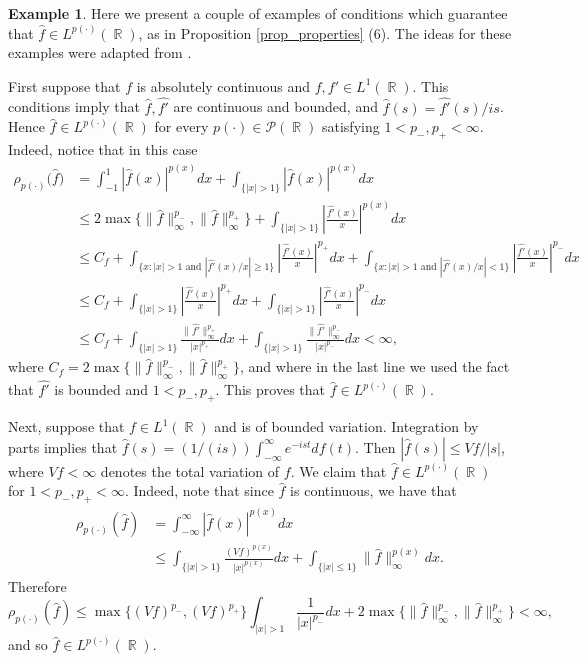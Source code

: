 \documentclass[11pt,reqno]{amsart}
\theoremstyle{definition}
\newtheorem{example}[theorem]{Example}
\theoremstyle{definition}
\theoremstyle{definition}
\DeclareMathOperator{\R}{\mathbb{R}}
\newcommand{\p}{p(\cdot)}
\newcommand{\Lp}{L^{\p}(\R)}
\begin{document}
\begin{example} 
Here we present a couple of examples of  conditions which guarantee that $\widehat{f}\in\Lp$, as in Proposition \ref{prop_properties} {(6)}. The ideas for these examples were adapted from \cite{Talvila2025}.

    First suppose that $f$ is absolutely continuous and $f,f'\in L^1(\R)$. This conditions imply that $\widehat{f},\widehat{f'}$ are continuous and bounded, and $\widehat{f}(s)=\widehat{f'}(s)/is$. Hence $\widehat{f}\in L^{\p}(\R)$ for every $\p\in\mathcal{P}(\R)$ satisfying $1<p_{-},p_{+}<\infty$. Indeed, notice that in this case
    \begin{align*}
        \rho_{\p}\Big(\hat{f}\Big)&=\int_{-1}^1 |\widehat{f}(x)|^{p(x)}dx+\int_{\{|x|>1\}}|\widehat{f}(x)|^{p(x)}dx\\
        &\leq 2\max\{\|\widehat{f}\|_{\infty}^{p_{-}},\|\widehat{f}\|_{\infty}^{p_{+}}\}
        +\int_{\{|x|>1\}}\left|\frac{\widehat{f'}(x)}{x}\right|^{p(x)}dx\\
        &\leq C_f+\int_{\{x:|x|>1 \text{ and }|\widehat{f'}(x)/x|\geq 1\}} \left|\frac{\widehat{f'}(x)}{x}\right|^{p_{+}}dx+\int_{\{x:|x|>1 \text{ and }|\widehat{f'}(x)/x|< 1\}} \left|\frac{\widehat{f'}(x)}{x}\right|^{p_{-}}dx\\
        &\leq C_f+\int_{\{|x|>1\}} \left|\frac{\widehat{f'}(x)}{x}\right|^{p_{+}}dx+\int_{\{|x|>1\}} \left|\frac{\widehat{f'}(x)}{x}\right|^{p_{-}}dx\\
        &\leq C_f+\int_{\{|x|>1\}} \frac{\|\widehat{f'}\|^{p_+}_\infty}{|x|^{p_{+}}}dx+\int_{\{|x|>1\}} \frac{\|\widehat{f'}\|^{p_-}_\infty}{|x|^{p_{-}}}dx<\infty,
    \end{align*}
    where $C_f= 2\max\{\|\widehat{f}\|_{\infty}^{p_{-}},\|\widehat{f}\|_{\infty}^{p_{+}}\}$, and where in the last line we used the fact that $\widehat{f'}$ is bounded and $1<p_{-},p_{+}$. This proves that $\widehat{f}\in \Lp$.

    Next, suppose that $f\in L^1(\R)$ and is of bounded variation. Integration by parts implies that $\widehat{f}(s)=(1/(is))\int_{-\infty}^\infty e^{-ist}df(t)$. Then $|\widehat{f}(s)|\leq Vf/|s|$, where $Vf<\infty$ denotes the total variation of $f$. We claim that $\widehat{f}\in \Lp$ for $1<p_{-},p_{+}<\infty$. Indeed, note that since $\widehat{f}$ is continuous, we have that
    \begin{align*}
        \rho_{\p}(\widehat{f})&=\int_{-\infty}^\infty|\widehat{f}(x)|^{p(x)}dx\\
        &\leq \int_{\{|x|>1\}}\frac{(Vf)^{p(x)}}{|x|^{p(x)}}dx+\int_{\{|x|\leq1\}}\|\widehat{f}\|_{\infty}^{p(x)}dx.
    \end{align*}
  Therefore
\begin{equation*}
    \rho_{\p}(\widehat{f})\leq \max\{(Vf)^{p_{-}},(Vf)^{p_{+}}\}\int_{|x|>1}\frac{1}{|x|^{p_{-}}}dx+2\max\{\|\widehat{f}\|_{\infty}^{p_{-}},\|\widehat{f}\|_{\infty}^{p_{+}}\}<\infty,
\end{equation*}
and so $\widehat{f}\in\Lp$.
\end{example}
\end{document}
